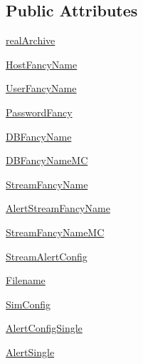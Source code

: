 \subsection*{Public Attributes}
\begin{DoxyCompactItemize}
\item 
\hyperlink{classamonpy_1_1dbase_1_1test_1_1test__db__write_1_1_test_d_b_write_a21f01f500a675067822bf868ce371306}{real\-Archive}
\item 
\hyperlink{classamonpy_1_1dbase_1_1test_1_1test__db__write_1_1_test_d_b_write_a1d99ea6d169624f39acc56254f9f7f30}{Host\-Fancy\-Name}
\item 
\hyperlink{classamonpy_1_1dbase_1_1test_1_1test__db__write_1_1_test_d_b_write_ab23c3c078c9ef84ff80e595d0906cd83}{User\-Fancy\-Name}
\item 
\hyperlink{classamonpy_1_1dbase_1_1test_1_1test__db__write_1_1_test_d_b_write_a69e2b25f75c000b814fa55d4945cd241}{Password\-Fancy}
\item 
\hyperlink{classamonpy_1_1dbase_1_1test_1_1test__db__write_1_1_test_d_b_write_a7b07a25b051063de016eaa355562eac3}{D\-B\-Fancy\-Name}
\item 
\hyperlink{classamonpy_1_1dbase_1_1test_1_1test__db__write_1_1_test_d_b_write_ad305c09b7cfbca1150be4b5819d0fdf4}{D\-B\-Fancy\-Name\-M\-C}
\item 
\hyperlink{classamonpy_1_1dbase_1_1test_1_1test__db__write_1_1_test_d_b_write_a12e956ebf3f624d6b36bb053369dd608}{Stream\-Fancy\-Name}
\item 
\hyperlink{classamonpy_1_1dbase_1_1test_1_1test__db__write_1_1_test_d_b_write_afe1cf31a726c2a34b3f8b3a5d130c3af}{Alert\-Stream\-Fancy\-Name}
\item 
\hyperlink{classamonpy_1_1dbase_1_1test_1_1test__db__write_1_1_test_d_b_write_a2096a0b2fb2fe15fcb2894f1a7d61c68}{Stream\-Fancy\-Name\-M\-C}
\item 
\hyperlink{classamonpy_1_1dbase_1_1test_1_1test__db__write_1_1_test_d_b_write_a2e1e2201ab54a4ea4eb59294ada2fd1a}{Stream\-Alert\-Config}
\item 
\hyperlink{classamonpy_1_1dbase_1_1test_1_1test__db__write_1_1_test_d_b_write_a9d4454368eabffc5e634852d7f6bf809}{Filename}
\item 
\hyperlink{classamonpy_1_1dbase_1_1test_1_1test__db__write_1_1_test_d_b_write_a23801af3747df6a10fe1e3e087f41ddc}{Sim\-Config}
\item 
\hyperlink{classamonpy_1_1dbase_1_1test_1_1test__db__write_1_1_test_d_b_write_a46fd1b5ec3c30b43fc1ba03a19603f3a}{Alert\-Config\-Single}
\item 
\hyperlink{classamonpy_1_1dbase_1_1test_1_1test__db__write_1_1_test_d_b_write_abf87a227a67042fea9ec1a8056656d77}{Alert\-Single}
\end{DoxyCompactItemize}


